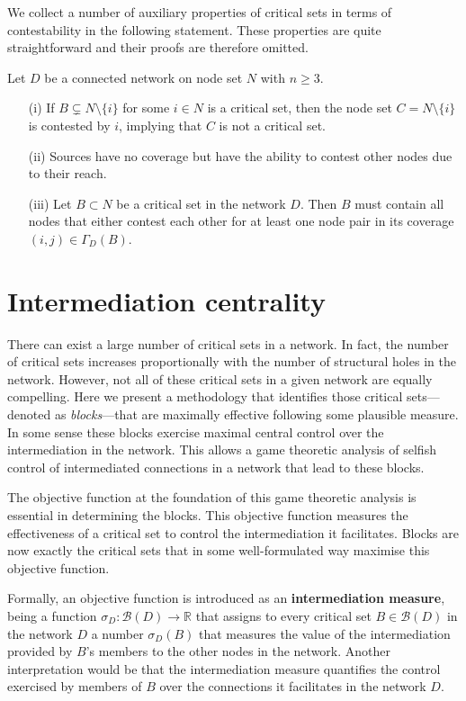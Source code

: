 \bigskip\noindent
We collect a number of auxiliary properties of critical sets in terms of contestability in the following statement. These properties are quite straightforward and their proofs are therefore omitted.
\begin{property}
Let $D$ be a connected network on node set $N$ with $n \geqslant 3$.
\begin{itemize}
\item[(i)] If $B \subsetneq N \setminus \{ i \}$ for some $i \in N$ is a critical set, then the node set $C = N \setminus \{ i \}$ is contested by $i$, implying that $C$ is not a critical set.

\item[(ii)] Sources have no coverage but have the ability to contest other nodes due to their reach.

\item[(iii)] Let $B \subset N$ be a critical set in the network $D$. Then $B$ must contain all nodes that either contest each other for at least one node pair in its coverage $(i,j) \in \Gamma_D (B)$.
\end{itemize}
\end{property}

\section{Intermediation centrality}

There can exist a large number of critical sets in a network. In fact, the number of critical sets increases proportionally with the number of structural holes \citep{Burt2002} in the network. However, not all of these critical sets in a given network are equally compelling. Here we present a methodology that identifies those critical sets---denoted as \emph{blocks}---that are maximally effective following some plausible measure. In some sense these blocks exercise maximal central control over the intermediation in the network. This allows a game theoretic analysis of selfish control of intermediated connections in a network that lead to these blocks.

The objective function at the foundation of this game theoretic analysis is essential in determining the blocks. This objective function measures the effectiveness of a critical set to control the intermediation it facilitates. Blocks are now exactly the critical sets that in some well-formulated way maximise this objective function.

Formally, an objective function is introduced as an \textbf{intermediation measure}, being a function $\sigma_D \colon \mathcal{B} (D) \to \mathbb{R}$ that assigns to every critical set $B \in \mathcal{B}(D)$ in the network $D$ a number $\sigma_D (B)$ that measures the value of the intermediation provided by $B$'s members to the other nodes in the network. Another interpretation would be that the intermediation measure quantifies the control exercised by members of $B$ over the connections it facilitates in the network $D$.

